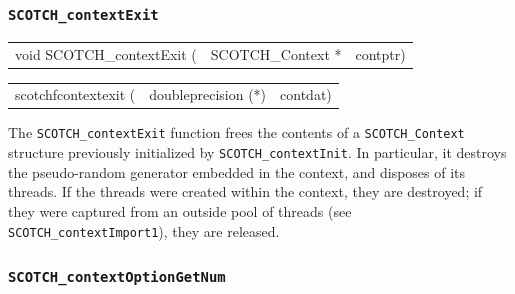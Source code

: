 \subsubsection{\texttt{SCOTCH\_contextExit}}

\begin{itemize}
\progsyn

{\tt\begin{tabular}{l@{}ll}
void SCOTCH\_contextExit ( & SCOTCH\_Context * & contptr)
\end{tabular}}

{\tt\begin{tabular}{l@{}ll}
scotchfcontextexit ( & doubleprecision (*) & contdat)
\end{tabular}}

\progdes

The \texttt{SCOTCH\_contextExit} function frees the contents of a
\texttt{SCOTCH\_\lbt Context} structure previously initialized by
\texttt{SCOTCH\_\lbt contextInit}. In particular, it destroys the
pseudo-random generator embedded in the context, and disposes of its
threads. If the threads were created within the context, they are
destroyed; if they were captured from an outside pool of threads (see
\texttt{SCOTCH\_\lbt context\lbt Import1}), they are released.
\end{itemize}

\subsubsection{\texttt{SCOTCH\_contextOptionGetNum}}
\label{sec-lib-context-option-get-num}

